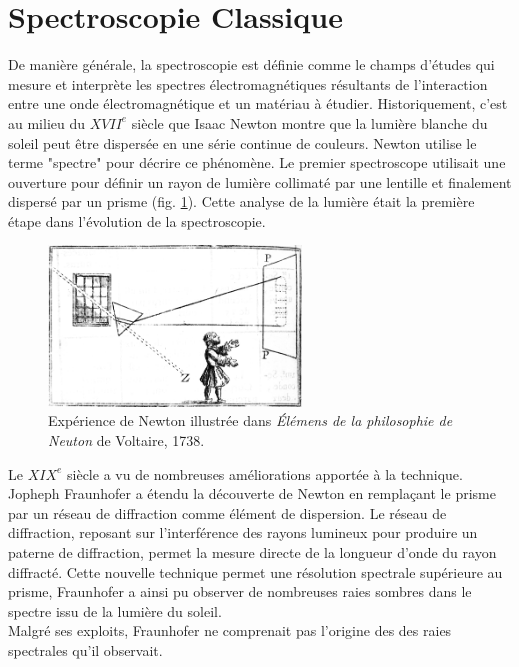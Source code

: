 \documentclass[a4paper]{report}
\begin{document}
	\section{Spectroscopie Classique}
	De manière générale, la spectroscopie est définie comme le champs d'études qui mesure et interprète les spectres électromagnétiques résultants de l'interaction entre une onde électromagnétique et un matériau à étudier.
	Historiquement, c'est au milieu du $XVII^{e}$ siècle que Isaac Newton montre que la lumière blanche du soleil peut être dispersée en une série continue de couleurs. Newton utilise le terme "spectre" pour décrire ce phénomène. Le premier spectroscope utilisait une ouverture pour définir un rayon de lumière collimaté par une lentille et finalement dispersé par un prisme (fig. \ref{illus:newton}). Cette analyse de la lumière était la première étape dans l'évolution de la spectroscopie.\\
	\begin{figure}[h]	
		\begin{center}			
		\includegraphics[width=0.6\textwidth]{spectro_newton}
		\caption{Expérience de Newton illustrée dans \textit{Élémens de la philosophie de Neuton} de Voltaire, 1738.}
		\label{illus:newton}				
		\end{center}
	\end{figure}
	Le $XIX^{e}$ siècle	a vu de nombreuses améliorations apportée à la technique. Jopheph Fraunhofer a étendu la découverte de Newton en remplaçant le prisme par un réseau de diffraction comme élément de dispersion. Le réseau de diffraction, reposant sur l'interférence des rayons lumineux pour produire un paterne de diffraction, permet la mesure directe de la longueur d'onde du rayon diffracté. Cette nouvelle technique permet une résolution spectrale supérieure au prisme, Fraunhofer a ainsi pu observer de nombreuses raies sombres dans le spectre issu de la lumière du soleil.\\
	Malgré ses exploits, Fraunhofer ne comprenait pas l'origine des des raies spectrales qu'il observait.
	
\end{document}
